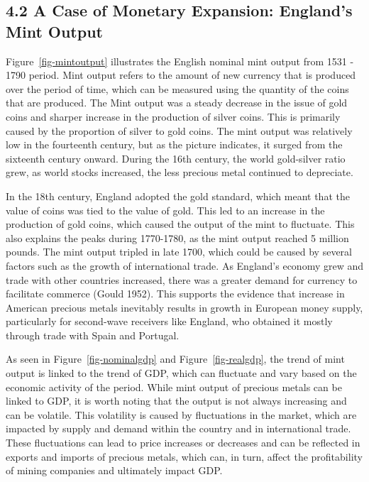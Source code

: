 \documentclass[
  letterpaper,
  DIV=11,
  numbers=noendperiod]{scrartcl}
\begin{document}
\hypertarget{a-case-of-monetary-expansion-englands-mint-output}{%
\subsection{4.2 A Case of Monetary Expansion: England's Mint
Output}\label{a-case-of-monetary-expansion-englands-mint-output}}

Figure~\ref{fig-mintoutput} illustrates the English nominal mint output
from 1531 - 1790 period. Mint output refers to the amount of new
currency that is produced over the period of time, which can be measured
using the quantity of the coins that are produced. The Mint output was a
steady decrease in the issue of gold coins and sharper increase in the
production of silver coins. This is primarily caused by the proportion
of silver to gold coins. The mint output was relatively low in the
fourteenth century, but as the picture indicates, it surged from the
sixteenth century onward. During the 16th century, the world gold-silver
ratio grew, as world stocks increased, the less precious metal continued
to depreciate.

In the 18th century, England adopted the gold standard, which meant that
the value of coins was tied to the value of gold. This led to an
increase in the production of gold coins, which caused the output of the
mint to fluctuate. This also explains the peaks during 1770-1780, as the
mint output reached 5 million pounds. The mint output tripled in late
1700, which could be caused by several factors such as the growth of
international trade. As England's economy grew and trade with other
countries increased, there was a greater demand for currency to
facilitate commerce (Gould 1952). This supports the evidence that
increase in American precious metals inevitably results in growth in
European money supply, particularly for second-wave receivers like
England, who obtained it mostly through trade with Spain and Portugal.

As seen in Figure~\ref{fig-nominalgdp} and Figure~\ref{fig-realgdp}, the
trend of mint output is linked to the trend of GDP, which can fluctuate
and vary based on the economic activity of the period. While mint output
of precious metals can be linked to GDP, it is worth noting that the
output is not always increasing and can be volatile. This volatility is
caused by fluctuations in the market, which are impacted by supply and
demand within the country and in international trade. These fluctuations
can lead to price increases or decreases and can be reflected in exports
and imports of precious metals, which can, in turn, affect the
profitability of mining companies and ultimately impact GDP.
\end{document}
